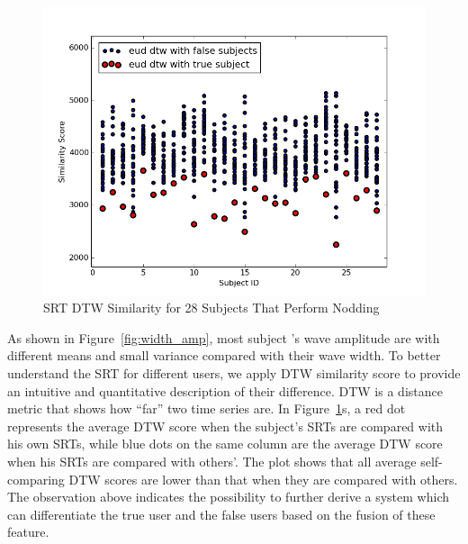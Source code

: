 \begin{figure}
\includegraphics[width=\columnwidth]{figure/resp_time_dtw.png}
\caption{\label{fig:resp_time_dtw} SRT DTW Similarity for 28 Subjects That Perform Nodding}
\end{figure}

As shown in Figure~\ref{fig:width_amp}, most subject ’s wave amplitude are with different means and small variance compared with their wave width.  To better understand the SRT for different users,  we apply DTW similarity score to provide an intuitive and quantitative description of their difference.  DTW is a distance metric that shows how “far” two time series are. In Figure~\ref{fig:resp_time_dtw}s,  a red dot represents the average DTW score when the subject’s SRTs are compared with his own SRTs, while blue dots on the same column are the average DTW score when his SRTs are compared with others’.  The plot shows that all average self-comparing DTW scores are lower than that when they are compared with others. The observation above indicates the possibility to further derive a system which can differentiate the true user and the false users based on the fusion of these feature. 
